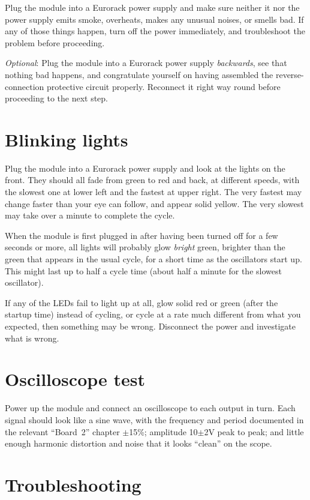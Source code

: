 Plug the module into a Eurorack power supply and make sure
neither it nor the power supply emits smoke, overheats, makes any unusual
noises, or smells bad.  If any of those things happen, turn off the power
immediately, and troubleshoot the problem before proceeding.

\emph{Optional}: Plug the module into a Eurorack power supply
\emph{backwards}, see that nothing bad happens, and congratulate yourself on
having assembled the reverse-connection protective circuit properly. 
Reconnect it right way round before proceeding to the next step.

\section{Blinking lights}

Plug the module into a Eurorack power supply and look at the lights on the
front.  They should all fade from green to red and back, at different
speeds, with the slowest one at lower left and the fastest at upper right. 
The very fastest may change faster than your eye can follow, and appear
solid yellow.  The very slowest may take over a minute to complete the
cycle.

When the module is first plugged in after having been turned off for a few
seconds or more, all lights will probably glow \emph{bright} green, brighter
than the green that appears in the usual cycle, for a short time as the
oscillators start up.  This might last up to half a cycle time (about half a
minute for the slowest oscillator).

If any of the LEDs fail to light up at all, glow solid red or green (after
the startup time) instead of cycling, or cycle at a rate much different from
what you expected, then something may be wrong.  Disconnect the power and
investigate what is wrong.

\section{Oscilloscope test}

Power up the module and connect an oscilloscope to each output in turn. 
Each signal should look like a sine wave, with the frequency and period
documented in the relevant ``Board~2'' chapter $\pm$15\%; amplitude
10$\pm$2V peak to peak; and little enough harmonic
distortion and noise that it looks ``clean'' on the scope.

\section{Troubleshooting}

